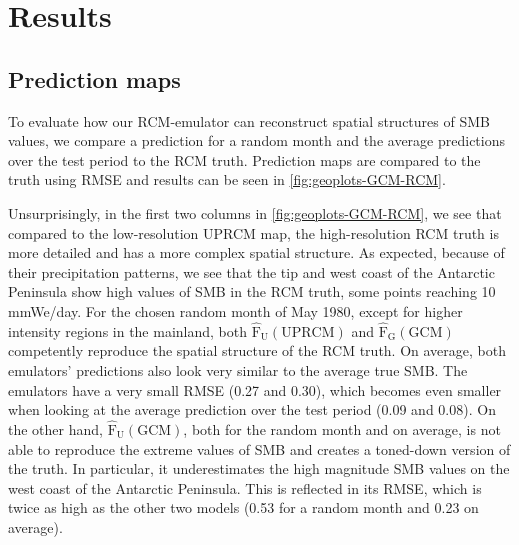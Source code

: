 \documentclass[a4paper,11pt,oneside]{report}
\begin{document}

\chapter{Results}

\section{Prediction maps}\label{subsec:geoplots}
To evaluate how our RCM-emulator can reconstruct spatial structures of SMB values, we compare a prediction for a random month and the average predictions over the test period to the RCM truth. Prediction maps are compared to the truth using RMSE and results can be seen in \autoref{fig:geoplots-GCM-RCM}. 

Unsurprisingly, in the first two columns in \autoref{fig:geoplots-GCM-RCM}, we see that compared to the low-resolution UPRCM map, the high-resolution RCM truth is more detailed and has a more complex spatial structure. As expected, because of their precipitation patterns, we see that the tip and west coast of the Antarctic Peninsula show high values of SMB in the RCM truth, some points reaching 10 \si{mmWe/day}. For the chosen random month of May 1980, except for higher intensity regions in the mainland, both $\mathrm{\hat{F}_{U}(UPRCM)}$ and $\mathrm{\hat{F}_{G}(GCM)}$ competently reproduce the spatial structure of the RCM truth. On average, both emulators' predictions also look very similar to the average true SMB. The emulators have a very small RMSE (0.27 and 0.30), which becomes even smaller when looking at the average prediction over the test period (0.09 and 0.08). On the other hand, $\mathrm{\hat{F}_{U}(GCM)}$, both for the random month and on average, is not able to reproduce the extreme values of SMB and creates a toned-down version of the truth. In particular, it underestimates the high magnitude SMB values on the west coast of the Antarctic Peninsula. This is reflected in its RMSE, which is twice as high as the other two models (0.53 for a random month and 0.23 on average). 
\end{document}
